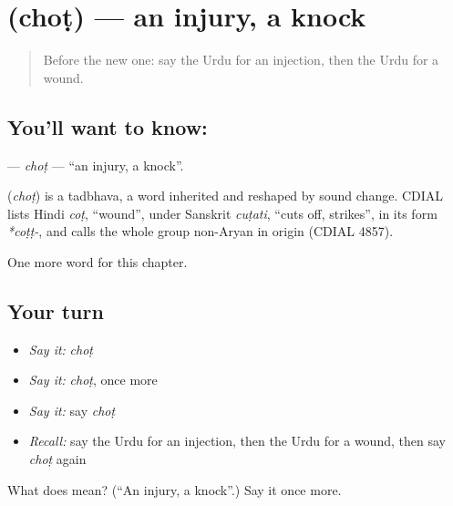 \section[\texorpdfstring{\ur{چوٹ} (choṭ)}{چوٹ (choṭ)}]{ (choṭ) — an injury, a knock}

\label{lesson:UR-C185-chot}



\begin{quote}
Before the new one: say the Urdu for an injection, then the Urdu for a wound.
\end{quote}

\subsection*{You'll want to know: }
\textbf{} — \emph{choṭ} — \textquotedblleft{}an injury, a knock\textquotedblright{}.

\begin{cousinweb}
\textbf{} (\emph{choṭ}) is a tadbhava, a word inherited and reshaped by sound change. CDIAL lists Hindi \emph{coṭ}, \textquotedblleft{}wound\textquotedblright{}, under Sanskrit \emph{cuṭati}, \textquotedblleft{}cuts off, strikes\textquotedblright{}, in its form \emph{*coṭṭ-}, and calls the whole group non-Aryan in origin (CDIAL 4857).
\end{cousinweb}

\begin{grammarlens}[title={What you've built}]
One more word for this chapter.
\end{grammarlens}

\subsection*{Your turn}
\begin{itemize}
\raggedright
  \item \emph{Say it:} \emph{choṭ}
  \item \emph{Say it:} \emph{choṭ}, once more
  \item \emph{Say it:} say \emph{choṭ}
  \item \emph{Recall:} say the Urdu for an injection, then the Urdu for a wound, then say \emph{choṭ} again
\end{itemize}

\begin{tcolorbox}[breakable,colback=teal!4,colframe=teal!35!black,title={Before you move on}]
What does  mean? (\textquotedblleft{}An injury, a knock\textquotedblright{}.) Say it once more.
\end{tcolorbox}
